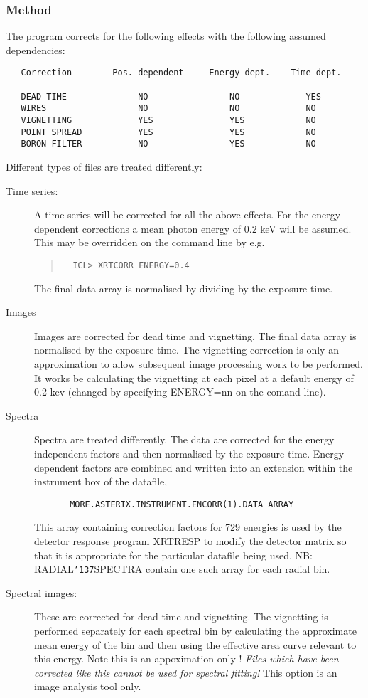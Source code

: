 \documentclass{book}
\renewcommand{\_}{{\tt\char'137}}     %
\begin{document}
\subsubsection{Method}
The program corrects for the following effects with the following
assumed dependencies:
\begin{verbatim}
   Correction        Pos. dependent     Energy dept.    Time dept.
  ------------      ----------------   --------------  ------------
   DEAD TIME              NO                NO             YES
   WIRES                  NO                NO             NO
   VIGNETTING             YES               YES            NO
   POINT SPREAD           YES               YES            NO
   BORON FILTER           NO                YES            NO
\end{verbatim}
Different types of files are treated differently:
 
\begin{description}
\item[Time series:]
A time series will be corrected for all the above effects. For the
energy dependent corrections a mean photon energy of 0.2 keV will be
assumed. This may be overridden on the command line by e.g.
\begin{quote}\begin{verbatim}
  ICL> XRTCORR ENERGY=0.4
\end{verbatim}\end{quote}
The final data array is normalised by dividing by the exposure time.
\item[Images]
Images are corrected for dead time and vignetting.
The final data array is normalised by the exposure time.
The vignetting correction is only an approximation to allow
subsequent image processing work to be performed. It works
be calculating the vignetting at each pixel at a default energy of
0.2 kev (changed by specifying ENERGY=nn on the comand line).
\item[Spectra]
Spectra are treated differently. The data are corrected for the
energy independent factors and then normalised by the exposure time.
Energy dependent factors are combined and written into an extension
within the instrument box of the datafile,
\begin{verbatim}
       MORE.ASTERIX.INSTRUMENT.ENCORR(1).DATA_ARRAY
\end{verbatim}
This array containing correction factors for 729 energies is used by
the detector response program XRTRESP to modify the detector matrix
so that it is appropriate for the particular datafile being used.
NB: RADIAL\_SPECTRA contain one such array for each radial bin.
 
\item[Spectral images:]
These are corrected for dead time and vignetting. The vignetting
is performed separately for each spectral bin by calculating the
approximate mean energy of the bin and then using the effective
area curve relevant to this energy. Note this is an appoximation
only ! {\em Files which have been corrected like this cannot be used for
spectral fitting!} This option is an image analysis tool only.
\end{description}
\end{document}
